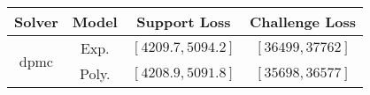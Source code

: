 \begin{tabular}{cc|c|c} 
\hline 
 Solver & Model & Support Loss  & Challenge Loss \tabularnewline\hline 
\hline 
\multirow{2}{*}{dpmc} & Exp. & $\left[4209.7,5094.2\right]$ & $\left[36499,37762\right]$ \tabularnewline 
 & Poly. & $\left[4208.9,5091.8\right]$ & $\left[35698,36577\right]$ \tabularnewline 
\hline 
\end{tabular} 

